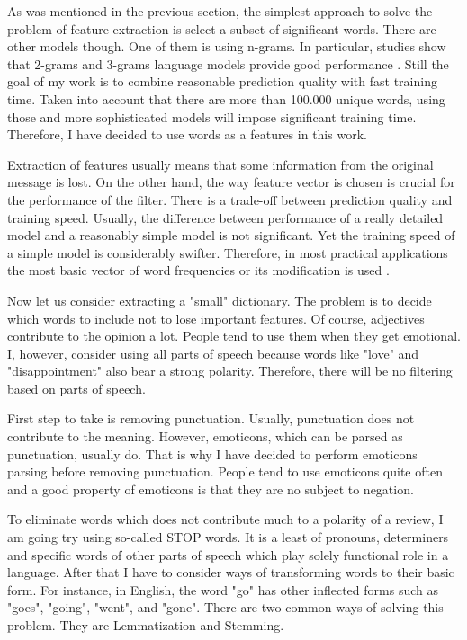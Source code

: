 \documentclass[12pt]{report}
\begin{document}
As was mentioned in the previous section, the simplest approach to solve the problem of feature extraction is select a subset of significant words. There are other models though. One of them is using n-grams. In particular, studies show that 2-grams and 3-grams language models provide good performance \cite{Chris Manning and Hinrich}. Still the goal of my work is to combine reasonable prediction quality with fast training time. Taken into account that there are more than 100.000 unique words, using those and more sophisticated models will impose significant training time. Therefore, I have decided to use words as a features in this work. 

Extraction of features usually means that some information from the original message is lost. On the other hand, the way feature vector is chosen is crucial for the performance of the filter. There is a trade-off between prediction quality and training speed. Usually, the difference between performance of a really detailed model and a reasonably simple model is not significant. Yet the training speed of a simple model is considerably swifter. Therefore, in most practical applications the most basic vector of word frequencies or its modification is used \cite{Witten and Frank}.

Now let us consider extracting a "small" dictionary. The problem is to decide which words to include not to lose important features. Of course, adjectives contribute to the opinion a lot. People tend to use them when they get emotional. I, however, consider using all parts of speech because words like "love" and "disappointment" also bear a strong polarity. Therefore, there will be no filtering based on parts of speech.

First step to take is removing punctuation. Usually, punctuation does not contribute to the meaning. However, emoticons, which can be parsed as punctuation, usually do. That is why I have decided to perform emoticons parsing before removing punctuation. People tend to use emoticons quite often and a good property of emoticons is that they are no subject to negation.

To eliminate words which does not contribute much to a polarity of a review, I am going try using so-called STOP words. It is a least of pronouns, determiners and specific words of other parts of speech which play solely functional role in a language. After that I have to consider ways of transforming words to their basic form. For instance, in English, the word "go" has other inflected forms such as "goes", "going", "went", and "gone". There are two common ways of solving this problem. They are Lemmatization and Stemming.
\end{document}
